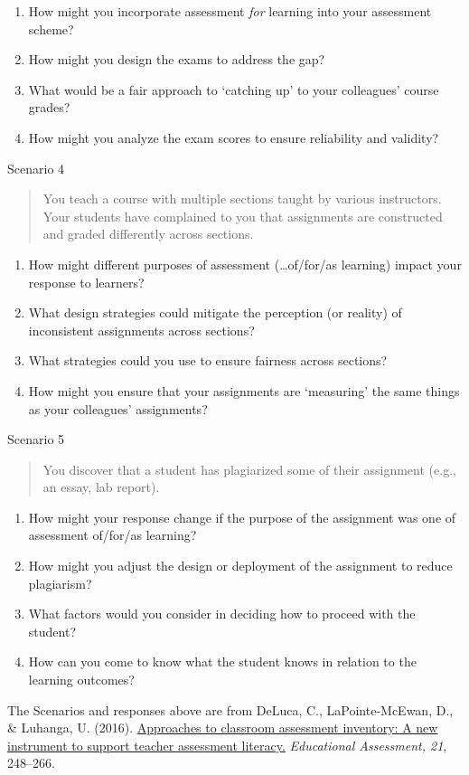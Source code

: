 \documentclass[
]{book}
\providecommand{\tightlist}{%
  \setlength{\itemsep}{0pt}\setlength{\parskip}{0pt}}
\begin{document}
\begin{enumerate}
\def\labelenumi{\arabic{enumi}.}
\tightlist
\item
  How might you incorporate assessment \emph{for} learning into your assessment scheme?
\item
  How might you design the exams to address the gap?
\item
  What would be a fair approach to `catching up' to your colleagues' course grades?
\item
  How might you analyze the exam scores to ensure reliability and validity?
\end{enumerate}

Scenario 4

\begin{quote}
You teach a course with multiple sections taught by various instructors. Your students have complained to you that assignments are constructed and graded differently across sections.
\end{quote}

\begin{enumerate}
\def\labelenumi{\arabic{enumi}.}
\tightlist
\item
  How might different purposes of assessment (\ldots of/for/as learning) impact your response to learners?
\item
  What design strategies could mitigate the perception (or reality) of inconsistent assignments across sections?
\item
  What strategies could you use to ensure fairness across sections?
\item
  How might you ensure that your assignments are `measuring' the same things as your colleagues' assignments?
\end{enumerate}

Scenario 5

\begin{quote}
You discover that a student has plagiarized some of their assignment (e.g., an essay, lab report).
\end{quote}

\begin{enumerate}
\def\labelenumi{\arabic{enumi}.}
\tightlist
\item
  How might your response change if the purpose of the assignment was one of assessment of/for/as learning?
\item
  How might you adjust the design or deployment of the assignment to reduce plagiarism?
\item
  What factors would you consider in deciding how to proceed with the student?
\item
  How can you come to know what the student knows in relation to the learning outcomes?
\end{enumerate}

\begin{reflect}
The Scenarios and responses above are from DeLuca, C., LaPointe-McEwan,
D., \& Luhanga, U. (2016). \href{https://doi.org/10/gfgtsg}{Approaches
to classroom assessment inventory: A new instrument to support teacher
assessment literacy.} \emph{Educational Assessment, 21}, 248--266.
\end{reflect}

  
\end{document}
